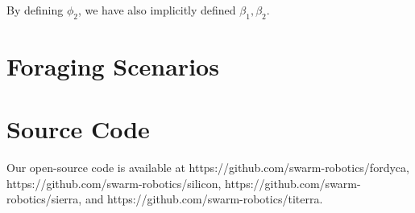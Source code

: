 By defining $\phi_2$, we have also implicitly defined $\beta_1,\beta_2$.

\section{Foraging Scenarios}\label{sec:exp-foraging-scenarios}


\section{Source Code}\label{sec:exp-source-code}


Our open-source code is available at https://github.com/swarm-robotics/fordyca,
https://github.com/swarm-robotics/silicon,
https://github.com/swarm-robotics/sierra, and
https://github.com/swarm-robotics/titerra.

